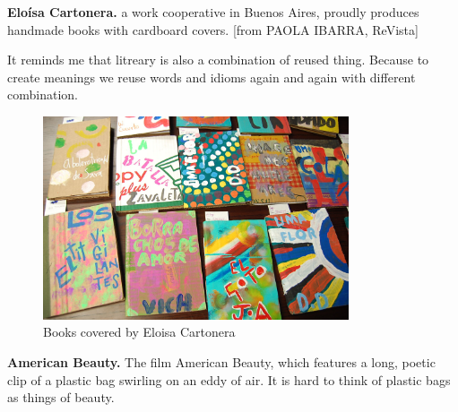 \textbf{Eloísa Cartonera.} a work cooperative in Buenos Aires, proudly produces handmade books with cardboard covers.   [from PAOLA IBARRA, ReVista]

It reminds me that litreary is also a combination of reused thing. Because to create meanings we reuse words and idioms again and again with different combination.

\begin{figure}[ht]
  \centering
  \includegraphics[height=6cm]{graphics/EloisaCartonera_Books2.jpg}
  \caption{Books covered by Eloisa Cartonera}
  \label{fig:EloisaCartonera_Books}
\end{figure}





%
%
\textbf{American Beauty.} The film American Beauty, which features a long, poetic clip of a plastic bag swirling on an eddy of air. It is hard to think of plastic bags as things of beauty. 





